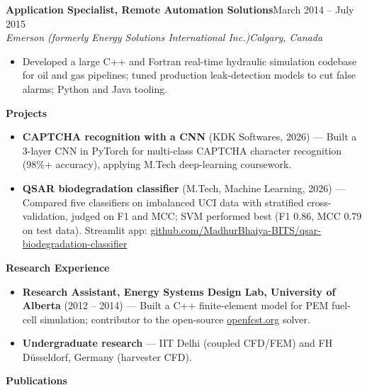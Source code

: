 \documentclass[a4paper,10pt]{article}
\newcommand{\resheading}[1]{%
  \par\vspace{10pt}%
  \noindent\colorbox{headbg}{\parbox{\dimexpr\linewidth-2\fboxsep\relax}{%
    \strut\color{accent}\large\bfseries #1}}\par%
  \vspace{5pt}%
}
\newcommand{\resrole}[4]{%
  {\color{accent}\bfseries #1}\hfill{\color{muted}#2}\\%
  {\itshape #3}\hfill{\color{muted}\itshape #4}\par\vspace{1pt}%
}
\begin{document}
\resrole{Application Specialist, Remote Automation Solutions}{March 2014 -- July 2015}{Emerson (formerly Energy Solutions International Inc.)}{Calgary, Canada}
\begin{itemize}
  \item Developed a large C++ and Fortran real-time hydraulic simulation codebase for oil and gas pipelines; tuned production leak-detection models to cut false alarms; Python and Java tooling.
\end{itemize}

\resheading{Projects}

\begin{itemize}
  \item \textbf{CAPTCHA recognition with a CNN} {\color{muted}(KDK Softwares, 2026)} --- Built a 3-layer CNN in PyTorch for multi-class CAPTCHA character recognition (98\%+ accuracy), applying M.Tech deep-learning coursework.
  \item \textbf{QSAR biodegradation classifier} {\color{muted}(M.Tech, Machine Learning, 2026)} --- Compared five classifiers on imbalanced UCI data with stratified cross-validation, judged on F1 and MCC; SVM performed best (F1 0.86, MCC 0.79 on test data). Streamlit app: \href{https://github.com/MadhurBhaiya-BITS/qsar-biodegradation-classifier}{github.com/MadhurBhaiya-BITS/qsar-biodegradation-classifier}
\end{itemize}

\resheading{Research Experience}

\begin{itemize}
  \item \textbf{Research Assistant, Energy Systems Design Lab, University of Alberta} {\color{muted}(2012 -- 2014)} --- Built a C++ finite-element model for PEM fuel-cell simulation; contributor to the open-source \href{https://www.openfcst.org}{openfcst.org} solver.
  \item \textbf{Undergraduate research} --- IIT Delhi (coupled CFD/FEM) and FH D\"usseldorf, Germany (harvester CFD).
\end{itemize}

\resheading{Publications}
\end{document}
